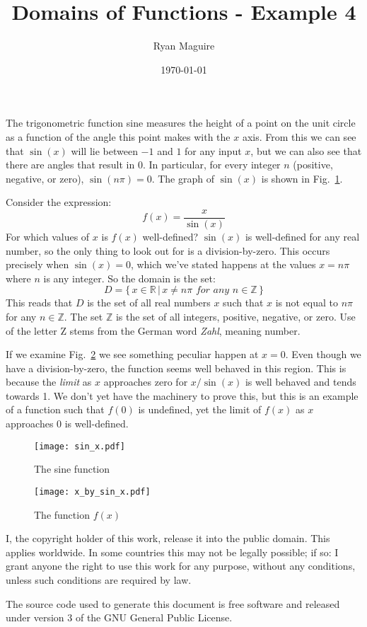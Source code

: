 \documentclass{article}
\title{Domains of Functions - Example 4}
\author{Ryan Maguire}
\date{\today}
\begin{document}
    \maketitle
    The trigonometric function sine measures the height of a point on the
    unit circle as a function of the angle this point makes with the $x$ axis.
    From this we can see that $\sin(x)$ will lie between $-1$ and $1$ for any
    input $x$, but we can also see that there are angles that result in
    $0$. In particular, for every integer $n$ (positive, negative, or zero),
    $\sin(n\pi)=0$. The graph of $\sin(x)$ is shown in
    Fig.~\ref{fig:sin_x}.
    \par\hfill\par
    Consider the expression:
    \begin{equation}
        f(x)=\frac{x}{\sin(x)}
    \end{equation}
    For which values of $x$ is $f(x)$ well-defined? $\sin(x)$ is well-defined
    for any real number, so the only thing to look out for is a
    division-by-zero.
    This occurs precisely when $\sin(x)=0$, which we've stated happens at the
    values $x=n\pi$ where $n$ is any integer. So the domain is the set:
    \begin{equation}
        D=\{\,x\in\mathbb{R}\,|\,x\ne{n\pi}\textit{ for any }n\in\mathbb{Z}\,\}
    \end{equation}
    This reads that $D$ is the set of all real numbers $x$ such that $x$ is
    not equal to $n\pi$ for any $n\in\mathbb{Z}$. The set $\mathbb{Z}$ is the
    set of all integers, positive, negative, or zero. Use of the letter Z stems
    from the German word \textit{Zahl}, meaning number.
    \par\hfill\par
    If we examine Fig.~\ref{fig:x_by_sin_x} we see something peculiar happen
    at $x=0$. Even though we have a division-by-zero, the function seems well
    behaved in this region. This is because the \textit{limit} as $x$
    approaches zero for $x/\sin(x)$ is well behaved and tends towards 1. We
    don't yet have the machinery to prove this, but this is an example of a
    function such that $f(0)$ is undefined, yet the limit of $f(x)$ as $x$
    approaches 0 is well-defined.
    \begin{figure}
        \centering
        \texttt{[image: sin\_x.pdf]}
        \caption{The sine function}
        \label{fig:sin_x}
    \end{figure}
    \begin{figure}
        \centering
        \texttt{[image: x\_by\_sin\_x.pdf]}
        \caption{The function $f(x)$}
        \label{fig:x_by_sin_x}
    \end{figure}
    \newpage
    I, the copyright holder of this work, release it into the public domain.
    This applies worldwide. In some countries this may not be legally possible;
    if so: I grant anyone the right to use this work for any purpose, without
    any conditions, unless such conditions are required by law.
    \par\hfill\par
    The source code used to generate this document is free software and released
    under version 3 of the GNU General Public License.
\end{document}
